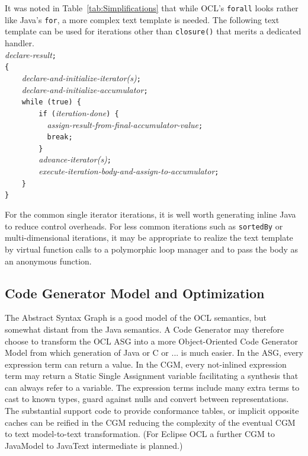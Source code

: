 \documentclass[sigconf]{acmart}
\begin{document}
It was noted in Table~\ref{tab:Simplifications} that while OCL's \verb|forall| looks rather like Java's \verb|for|, a more complex text template is needed. The following text template can be used for iterations other than \verb|closure()| that merits a dedicated handler. 
\\
\verb||\textit{declare-result}\verb|;|\\
\verb|{|\\
\verb|    |\textit{declare-and-initialize-iterator(s)}\verb|;|\\
\verb|    |\textit{declare-and-initialize-accumulator}\verb|;|\\
\verb|    while (true) {|\\
\verb|        if (|\textit{iteration-done}\verb|) {|\\
\verb|        	|\textit{assign-result-from-final-accumulator-value}\verb|;|\\
\verb|        	break;|\\
\verb|        }|\\
\verb|        |\textit{advance-iterator(s)}\verb|;|\\
\verb|        |\textit{execute-iteration-body-and-assign-to-accumulator}\verb|;|\\
\verb|    }|\\
\verb|}|

For the common single iterator iterations, it is well worth generating inline Java to reduce control overheads. For less common iterations such as \verb|sortedBy| or multi-dimensional iterations, it may be appropriate to realize the text template by virtual function calls to a polymorphic loop manager and to pass the body as an anonymous function.

\subsection{Code Generator Model and Optimization}

The Abstract Syntax Graph is a good model of the OCL semantics, but somewhat distant from the Java semantics. A Code Generator may therefore choose to transform the OCL ASG into a more Object-Oriented Code Generator Model from which generation of Java or C or ... is much easier. In the ASG, every expression term can return a value. In the CGM, every not-inlined expression term may return a Static Single Assignment variable facilitating a synthesis that can always refer to a variable. The expression terms include many extra terms to cast to known types, guard against nulls and convert between representations. The substantial support code to provide conformance tables, or implicit opposite caches can be reified in the CGM reducing the complexity of the eventual CGM to text model-to-text transformation. (For Eclipse OCL a further CGM to JavaModel to JavaText intermediate is planned.) 
\end{document}
